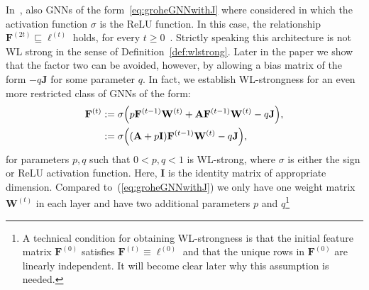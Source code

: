 In~\cite{grohewl}, also GNNs of the form~\ref{eq:groheGNNwithJ} where considered in which the activation function $\sigma$ is the ReLU function. In this case, the relationship
$\mathbf{F}^{(2t)}\sqsubseteq \pmb{\ell}^{(t)}$ holds, for every $t\geq 0$~\cite{grohewl}.
Strictly speaking this architecture is not WL strong in the sense of Definition~\ref{def:wlstrong}. Later in the paper we show that the factor two can be avoided, however, by allowing a bias matrix of the form $-q\mathbf{J}$ for some parameter $q$.
In fact, we establish WL-strongness for
an even more restricted class of GNNs of the form:
\begin{align}
\mathbf{F}^{(t)}&:=\sigma\Bigl(p\mathbf{F}^{(t-1)}\mathbf{W}^{(t)}+ \mathbf{A}\mathbf{F}^{(t-1)}\mathbf{W}^{(t)} - q\mathbf{J}\Bigr), \label{eq:GNN}\\
&:=\sigma\Bigl((\mathbf{A}+p\mathbf{I})\mathbf{F}^{(t-1)}\mathbf{W}^{(t)} - q\mathbf{J}\Bigr), \label{eq:GNN2}
\end{align}
for parameters $p, q$ such that $0< p,q<1$ is WL-strong, where $\sigma$ is either the sign or ReLU activation function. Here, $\mathbf{I}$ is the identity matrix of appropriate dimension.
Compared to~(\ref{eq:groheGNNwithJ}) we only have one weight matrix $\mathbf{W}^{(t)}$ in each layer and have two additional parameters $p$ and $q$\footnote{A technical condition for obtaining WL-strongness is that  the initial feature matrix $\mathbf{F}^{(0)}$ satisfies $\mathbf{F}^{(t)}\equiv \pmb{\ell}^{(0)}$  and that
the unique rows in $\mathbf{F}^{(0)}$ are linearly independent. It will become clear later why this assumption is needed.}



%




